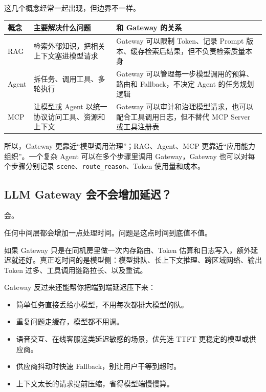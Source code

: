 \documentclass[10pt,a4paper]{ctexart}
\begin{document}
这几个概念经常一起出现，但边界不一样。


{\footnotesize
\begin{tabularx}{\textwidth}{|X|X|X|}
\hline
\textbf{概念} & \textbf{主要解决什么问题} & \textbf{和 Gateway 的关系} \\
\hline
RAG & 检索外部知识，把相关上下文塞进模型请求 & Gateway 可以限制 Token、记录 Prompt 版本、缓存检索后结果，但不负责检索质量本身 \\
\hline
Agent & 拆任务、调用工具、多轮执行 & Gateway 可以管理每一步模型调用的预算、路由和 Fallback，不决定 Agent 的任务规划逻辑 \\
\hline
MCP & 让模型或 Agent 以统一协议访问工具、资源和上下文 & Gateway 可以审计和治理模型请求，也可以配合工具调用日志，但不替代 MCP Server 或工具注册表 \\
\hline
\end{tabularx}
}



所以，Gateway 更靠近“模型调用治理”；RAG、Agent、MCP 更靠近“应用能力组织”。一个复杂 Agent 可以在多个步骤里调用 Gateway，Gateway 也可以对每个步骤分别记录 \texttt{scene}、\texttt{route\_reason}、Token 使用量和成本。



\subsection{LLM Gateway 会不会增加延迟？}


会。



任何中间层都会增加一点处理时间。问题是这点时间到底值不值。



如果 Gateway 只是在同机房里做一次内存路由、Token 估算和日志写入，额外延迟就还好。真正吃时间的是模型侧：模型排队、长上下文推理、跨区域网络、输出 Token 过多、工具调用链路拉长、以及重试。



Gateway 反过来还能帮你把端到端延迟压下来：


\begin{itemize}[itemsep=2pt, topsep=4pt]
  \item 简单任务直接丢给小模型，不用每次都排大模型的队。
  \item 重复问题走缓存，模型都不用调。
  \item 语音交互、在线客服这类延迟敏感的场景，优先选 TTFT 更稳定的模型或供应商。
  \item 供应商抖动时快速 Fallback，别让用户干等到超时。
  \item 上下文太长的请求提前压缩，省得模型端慢慢算。
\end{itemize}
\end{document}
